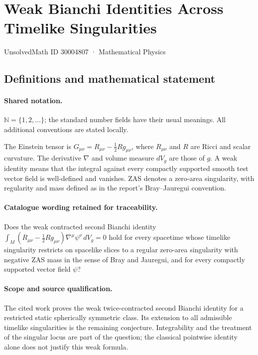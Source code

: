 \documentclass[11pt]{article}
\begin{document}
\setcounter{section}{30004806}
\section{Weak Bianchi Identities Across Timelike Singularities}\label{30004807}
{\small UnsolvedMath ID 30004807 · Mathematical Physics}
\subsection{Definitions and mathematical statement}

\paragraph{Shared notation.}$\mathbb N=\{1,2,\ldots\}$; the standard number fields have their usual meanings. All additional conventions are stated locally.


The Einstein tensor is $G_{\mu\nu}=R_{\mu\nu}-\tfrac12R g_{\mu\nu}$, where $R_{\mu\nu}$ and $R$ are Ricci and scalar curvature. The derivative $\nabla$ and volume measure $dV_g$ are those of $g$. A weak identity means that the integral against every compactly supported smooth test vector field is well-defined and vanishes. ZAS denotes a zero-area singularity, with regularity and mass defined as in the report's Bray--Jauregui convention.

\paragraph{Catalogue wording retained for traceability.}
Does the weak contracted second Bianchi identity $\int_M(R_{\mu\nu}-\tfrac12R g_{\mu\nu})\nabla^\mu\psi^\nu\,dV_g=0$ hold for every spacetime whose timelike singularity restricts on spacelike slices to a regular zero-area singularity with negative ZAS mass in the sense of Bray and Jauregui, and for every compactly supported vector field $\psi$?

\paragraph{Scope and source qualification.}The cited work proves the weak twice-contracted second Bianchi identity for a restricted static spherically symmetric class. Its extension to all admissible timelike singularities is the remaining conjecture. Integrability and the treatment of the singular locus are part of the question; the classical pointwise identity alone does not justify this weak formula.
\end{document}

